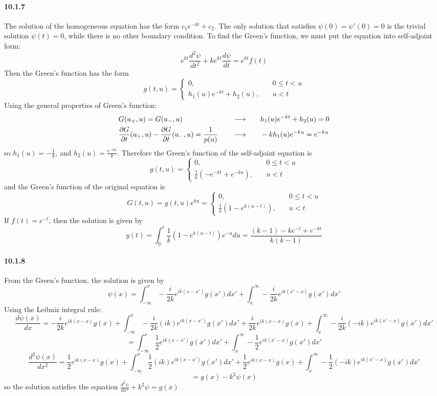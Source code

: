 \documentclass[a4paper]{article}
\begin{document}
\paragraph{10.1.7}
The solution of the homogeneous equation has the form $c_1e^{-kt}+c_2$. The only solution that satisfies $\psi(0)=\psi'(0)=0$ is the trivial solution $\psi(t)=0$, while there is no other boundary condition. To find the Green's function, we must  put the equation into self-adjoint form:
\[
e^{kt}\frac{d^2\psi}{dt^2}+ke^{kt}\frac{d\psi}{dt}=e^{kt}f(t)
\]
Then the Green's function has the form
\[
g(t,u)=
\begin{cases}
0,\quad & 0\leq t<u\\
h_1(u)e^{-kt}+h_2(u),\quad & u<t
\end{cases}
\]
Using the general properties of Green's function:
\begin{alignat*}{3}
    & G(u_+,u)=G(u_-,u)\quad && \longrightarrow\quad && h_1(u)e^{-kt}+h_2(u)=0 \\
    & \frac{\partial G}{\partial t}(u_+,u)-\frac{\partial G}{\partial t}(u_-,u)=\frac{1}{p(u)}\quad && \longrightarrow\quad && -kh_1(u)e^{-ku}=e^{-ku}
\end{alignat*}
so $h_1(u)=-\frac{1}{k}$, and $h_2(u)=\frac{e^{-ku}}{k}$. Therefore the Green's function of the self-adjoint equation is
\[
g(t,u)=
\begin{cases}
0,\quad & 0\leq t<u\\
\frac{1}{k}\left(-e^{-kt}+e^{-ku} \right) ,\quad & u<t
\end{cases}
\]
and the Green's function of the original equation is
\[
G(t,u)=g(t,u)e^{ku}=
\begin{cases}
0,\quad & 0\leq t<u\\
\frac{1}{k}\left(1-e^{k(u-t)} \right) ,\quad & u<t
\end{cases}
\]
If $f(t)=e^{-t}$, then the solution is given by
\[
y(t)=\int_0^t\frac{1}{k}\left(1-e^{k(u-t)} \right)e^{-u}du=\frac{(k-1)-ke^{-t}+e^{-kt}}{k(k-1)}
\]

\paragraph{10.1.8}
From the Green's function, the solution is given by 
\[
\psi(x)=\int_{-\infty}^x-\frac{i}{2k}e^{ik(x-x')}g(x')dx'+\int_x^\infty-\frac{i}{2k}e^{ik(x'-x)}g(x')dx'
\]
Using the Leibniz integral rule:
\[
\frac{d\psi(x)}{dx}=-\frac{i}{2k}e^{ik(x-x)}g(x)+\int_{-\infty}^x-\frac{i}{2k}(ik)e^{ik(x-x')}g(x')dx'+\frac{i}{2k}e^{ik(x-x)}g(x)+\int_x^\infty-\frac{i}{2k}(-ik)e^{ik(x'-x)}g(x')dx'
\]
\[
=\int_{-\infty}^x\frac{1}{2}e^{ik(x-x')}g(x')dx'+\int_x^\infty-
\frac{1}{2}e^{ik(x'-x)}g(x')dx'
\]
\[
\frac{d^2\psi(x)}{dx^2}=\frac{1}{2}e^{ik(x-x)}g(x)+\int_{-\infty}^x\frac{1}{2}(ik)e^{ik(x-x')}g(x')dx'+\frac{1}{2}e^{ik(x-x)}g(x)+\int_x^\infty-\frac{1}{2}(-ik)e^{ik(x'-x)}g(x')dx'
\]
\[
=g(x)-k^2\psi(x)
\]
so the solution satisfies the equation $\frac{d^2\psi}{dx^2}+k^2\psi=g(x)$
\end{document}
